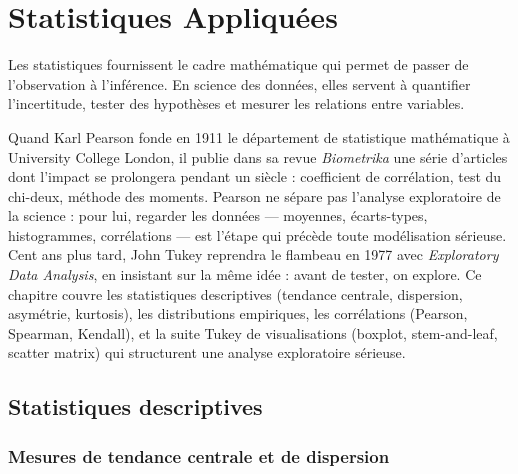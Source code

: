 \chapter{Statistiques Appliqu\'ees}
\label{ch:statistiques}

\begin{intuition}
Les statistiques fournissent le cadre math\'ematique qui permet de passer de l'observation \`a l'inf\'erence. En science des donn\'ees, elles servent \`a quantifier l'incertitude, tester des hypoth\`eses et mesurer les relations entre variables.
\end{intuition}

Quand Karl Pearson fonde en 1911 le département de statistique mathématique à University College London, il publie dans sa revue \emph{Biometrika} une série d'articles dont l'impact se prolongera pendant un siècle : coefficient de corrélation, test du chi-deux, méthode des moments. Pearson ne sépare pas l'analyse exploratoire de la science : pour lui, regarder les données --- moyennes, écarts-types, histogrammes, corrélations --- est l'étape qui précède toute modélisation sérieuse. Cent ans plus tard, John Tukey reprendra le flambeau en 1977 avec \emph{Exploratory Data Analysis}, en insistant sur la même idée : avant de tester, on explore. Ce chapitre couvre les statistiques descriptives (tendance centrale, dispersion, asymétrie, kurtosis), les distributions empiriques, les corrélations (Pearson, Spearman, Kendall), et la suite Tukey de visualisations (boxplot, stem-and-leaf, scatter matrix) qui structurent une analyse exploratoire sérieuse.

\section{Statistiques descriptives}

\subsection{Mesures de tendance centrale et de dispersion}

